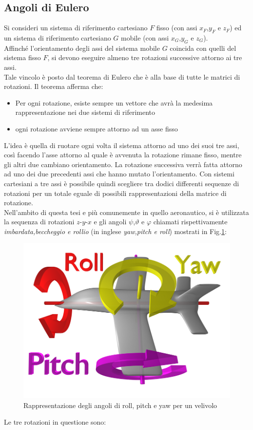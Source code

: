 \subsection{Angoli di Eulero}
\label{angoliEulero}
Si consideri \cite{assetto2} un sistema di riferimento cartesiano $F$  fisso (con assi $x_F$,$y_F$ e $z_F$) ed un sistema di riferimento cartesiano $G$ mobile (con assi $x_G$,$y_G$ e $z_G$). \\
Affinché l'orientamento degli assi del sistema mobile $G$ coincida con quelli del sistema fisso $F$, si devono eseguire almeno tre rotazioni successive attorno ai tre assi.\\
Tale vincolo è posto dal teorema di Eulero che è alla base di tutte le matrici di rotazioni. Il teorema afferma che:
\begin{itemize}
	\item Per ogni rotazione, esiste sempre un vettore che avrà la medesima rappresentazione nei due sistemi di riferimento
	\item ogni rotazione avviene sempre attorno ad un asse fisso
\end{itemize} 
L'idea è quella di ruotare ogni volta il sistema attorno ad uno dei suoi tre assi, così facendo l'asse attorno al quale è avvenuta la rotazione rimane fisso, mentre gli altri due cambiano orientamento. La rotazione successiva verrà fatta attorno ad uno dei due precedenti assi che hanno mutato l'orientamento. Con sistemi cartesiani a tre assi è possibile quindi scegliere tra dodici differenti sequenze di rotazioni per un totale eguale di possibili rappresentazioni della matrice di rotazione.\\
Nell'ambito di questa tesi e più comunemente in quello aeronautico, si è utilizzata la sequenza di rotazioni $z$-$y$-$x$ e gli angoli $\psi$,$\vartheta$ e $\varphi$ chiamati rispettivamente \textit{imbardata,beccheggio e rollio} (in inglese \textit{yaw,pitch e roll}) mostrati in Fig.\ref{fig:rpy}:
\begin{figure}[H]  
	\centering 
	\includegraphics[scale=0.5]{elaborazione/rpy.png}
	\caption{Rappresentazione degli angoli di roll, pitch e yaw per un velivolo \cite{wikiRoll}}
	\label{fig:rpy}
\end{figure}
Le tre rotazioni in questione sono:

